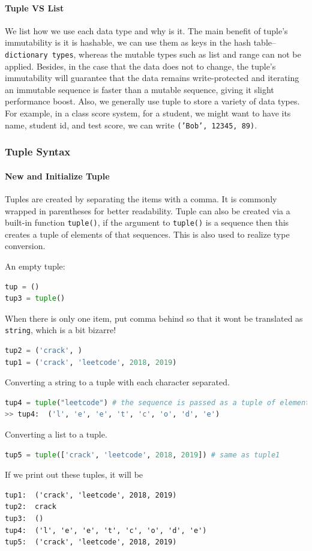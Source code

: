 \documentclass[../main.tex]{subfiles}
\begin{document}
\paragraph{Tuple VS List} We list how we use each data type and why is it.  The main benefit of tuple's immutability is it is hashable, we can use them as keys in the hash table--\texttt{dictionary types}, whereas the mutable types such as list and range can not be applied. Besides, in the case that the data does not to change, the tuple's immutability will guarantee that the data remains write-protected and iterating an immutable sequence is faster than a mutable sequence, giving it slight performance boost. Also, we generally use tuple to store a variety of data types. For example, in a class score system, for a student, we might want to have its name, student id, and test score, we can write \texttt{('Bob', 12345, 89)}. 



\subsubsection{Tuple Syntax}
\paragraph{New and Initialize Tuple} Tuples are created by separating the items with a comma. It is commonly wrapped in parentheses for better readability. Tuple can also be created via a built-in function \texttt{tuple()}, if the argument to \texttt{tuple()} is a sequence then this creates a tuple of elements of that sequences. This is also used to realize type conversion. 

An empty tuple: 
\begin{lstlisting}[language=Python]
tup = ()
tup3 = tuple() 
\end{lstlisting}
When there is only one item, put comma behind so that it wont be translated as \texttt{string}, which is a bit bizarre!
\begin{lstlisting}[language=Python]
tup2 = ('crack', )
tup1 = ('crack', 'leetcode', 2018, 2019)
\end{lstlisting}
Converting a string to a tuple with each character separated.
\begin{lstlisting}[language=Python]
tup4 = tuple("leetcode") # the sequence is passed as a tuple of elements
>> tup4:  ('l', 'e', 'e', 't', 'c', 'o', 'd', 'e') 
\end{lstlisting}
Converting a list to a tuple.
\begin{lstlisting}[language=Python]
tup5 = tuple(['crack', 'leetcode', 2018, 2019]) # same as tuple1
\end{lstlisting}
If we print out these tuples, it will be
\begin{lstlisting}
tup1:  ('crack', 'leetcode', 2018, 2019) 
tup2:  crack 
tup3:  () 
tup4:  ('l', 'e', 'e', 't', 'c', 'o', 'd', 'e') 
tup5:  ('crack', 'leetcode', 2018, 2019)
\end{lstlisting}
\end{document}
